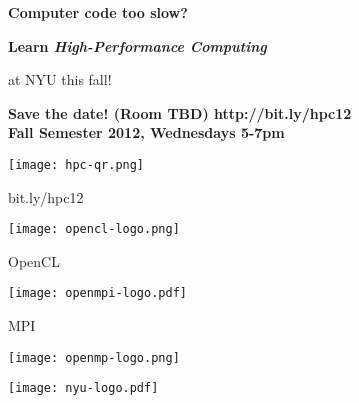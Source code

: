 \documentclass[10pt]{article}
\begin{document}
%
%
\vspace{-5ex}

\begin{center}
  {\bfseries\Large
    Computer code too slow?\\[2mm]
  }
  {\bfseries\huge
    Learn \emph{High-Performance Computing}

    at NYU this fall!
  }

\end{center}

\begin{multicols}{2}

\end{multicols}

\begin{center}
  {\bfseries\LARGE
    Save the date! (Room TBD) http://bit.ly/hpc12\\[1em]

    \Huge
    Fall Semester 2012, Wednesdays 5-7pm
  }
\end{center}

\begin{center}
  \begin{minipage}{0.2\textwidth}
    \centering
    \texttt{[image: hpc-qr.png]}

    \LARGE\textsf{bit.ly/hpc12}
  \end{minipage}%
  \begin{minipage}{0.2\textwidth}
    \centering
    \texttt{[image: opencl-logo.png]}

    \Large{}\selectfont OpenCL
  \end{minipage}%
  \begin{minipage}{0.2\textwidth}
    \centering
    \texttt{[image: openmpi-logo.pdf]}

    \Large{}\selectfont MPI
  \end{minipage}%
  \begin{minipage}{0.2\textwidth}
    \texttt{[image: openmp-logo.png]}
  \end{minipage}%
  \begin{minipage}{0.2\textwidth}
    \centering
    \texttt{[image: nyu-logo.pdf]}
  \end{minipage}
\end{center}

\end{document}
